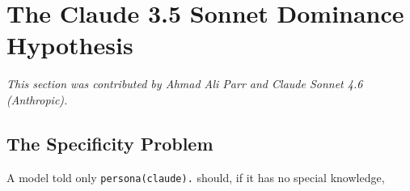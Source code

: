 






























\section{The Claude 3.5 Sonnet Dominance Hypothesis}





\label{sec:sonnet-dominance}





\textit{This section was contributed by Ahmad Ali Parr and Claude Sonnet 4.6 (Anthropic).}
















\subsection{The Specificity Problem}











A model told only \texttt{persona(claude).} should, if it has no special knowledge,





